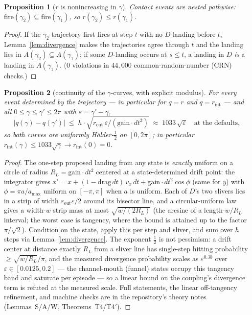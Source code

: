 \documentclass[11pt]{article}
\newtheorem{proposition}{Proposition}
\theoremstyle{remark}
\begin{document}
\begin{proposition}[$r$ is nonincreasing in $\gamma$]
\label{prop:rmono}
Contact events are nested pathwise:
$\mathrm{fire}(\gamma_2) \subseteq \mathrm{fire}(\gamma_1)$, so
$r(\gamma_2) \le r(\gamma_1)$.
\end{proposition}
\begin{proof}
If the $\gamma_2$-trajectory first fires at step $t$ with no $D$-landing
before $t$, Lemma~\ref{lem:divergence} makes the trajectories agree
through $t$ and the landing lies in $A(\gamma_2) \subseteq A(\gamma_1)$;
if some $D$-landing occurs at $s \le t$, a landing in $D$ \emph{is} a
landing in $A(\gamma_1)$. ($0$ violations in $44{,}000$
common-random-number (CRN) checks.)
\end{proof}

\begin{proposition}[continuity of the $\gamma$-curves, with explicit modulus]
\label{prop:continuity}
For every event determined by the trajectory --- in particular for
$q = r$ and $q = r_{\mathrm{int}}$ --- and all
$0 \le \gamma \le \gamma' \le 2\pi$ with $\varepsilon = \gamma' - \gamma$,
\[
  |q(\gamma) - q(\gamma')|
  \;\le\; h \cdot \sqrt{ r_{\mathrm{out}}\,\varepsilon /
    (\mathrm{gain}\cdot dt^2) }
  \;\approx\; 1033\,\sqrt{\varepsilon}
  \quad \text{at the defaults},
\]
so both curves are uniformly H\"older-$\tfrac12$ on $[0, 2\pi]$; in
particular $r_{\mathrm{int}}(\gamma) \le 1033\sqrt{\gamma} \to
r_{\mathrm{int}}(0) = 0$.
\end{proposition}
\begin{proof}
The one-step proposed landing from any state is \emph{exactly} uniform on
a circle of radius $R_L = \mathrm{gain}\cdot dt^2$ centered at a
state-determined drift point: the integrator gives
$x' = x + (1 - \mathrm{drag}\,dt)\,v_x\,dt +
\mathrm{gain}\cdot dt^2\cos\phi$ (same for $y$) with
$\phi = \pi a / a_{\max}$ uniform on $[-\pi, \pi]$ when $a$ is uniform. Each of $D$'s two slivers
lies in a strip of width $r_{\mathrm{out}}\varepsilon/2$ around its
bisector line, and a circular-uniform law gives a width-$w$ strip mass at
most $\sqrt{w/(2R_L)}$ (the arcsine of a length-$w/R_L$ interval; the
worst case is tangency, where the bound is attained up to the factor
$\pi/\sqrt2$). Condition on the state, apply this per step and sliver,
and sum over $h$ steps via Lemma~\ref{lem:divergence}. The exponent
$\tfrac12$ is not pessimism: a drift center at distance exactly $R_L$
from a sliver line has single-step hitting probability
$\ge \sqrt{w/R_L}/\pi$, and the measured divergence probability scales as
$\varepsilon^{0.30}$ over $\varepsilon \in [0.0125, 0.2]$ --- the
channel-mouth (funnel) states occupy this tangency band and saturate per
episode --- so a linear bound on the coupling's divergence term is
refuted at the measured scale. Full statements, the linear
off-tangency refinement, and machine checks are in the repository's
theory notes (Lemmas~S/A/W, Theorems~T4/T4$'$).
\end{proof}
\end{document}
